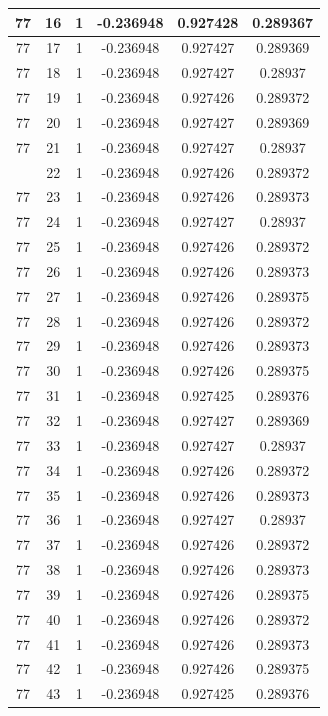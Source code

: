 \documentclass[12pt,a4paper]{article}
\numberwithin{equation}{section}
\numberwithin{figure}{section}
\numberwithin{table}{section}
\begin{document}
\begin{longtable}{|c|c|c|c|c|c|}
77 & 16 & 1 & -0.236948 & 0.927428 & 0.289367 \\ \hline
77 & 17 & 1 & -0.236948 & 0.927427 & 0.289369 \\ \hline
77 & 18 & 1 & -0.236948 & 0.927427 & 0.28937 \\ \hline
77 & 19 & 1 & -0.236948 & 0.927426 & 0.289372 \\ \hline
77 & 20 & 1 & -0.236948 & 0.927427 & 0.289369 \\ \hline
77 & 21 & 1 & -0.236948 & 0.927427 & 0.28937 \\ \hline
\pagebreak
77 & 22 & 1 & -0.236948 & 0.927426 & 0.289372 \\ \hline
77 & 23 & 1 & -0.236948 & 0.927426 & 0.289373 \\ \hline
77 & 24 & 1 & -0.236948 & 0.927427 & 0.28937 \\ \hline
77 & 25 & 1 & -0.236948 & 0.927426 & 0.289372 \\ \hline
77 & 26 & 1 & -0.236948 & 0.927426 & 0.289373 \\ \hline
77 & 27 & 1 & -0.236948 & 0.927426 & 0.289375 \\ \hline
77 & 28 & 1 & -0.236948 & 0.927426 & 0.289372 \\ \hline
77 & 29 & 1 & -0.236948 & 0.927426 & 0.289373 \\ \hline
77 & 30 & 1 & -0.236948 & 0.927426 & 0.289375 \\ \hline
77 & 31 & 1 & -0.236948 & 0.927425 & 0.289376 \\ \hline
77 & 32 & 1 & -0.236948 & 0.927427 & 0.289369 \\ \hline
77 & 33 & 1 & -0.236948 & 0.927427 & 0.28937 \\ \hline
77 & 34 & 1 & -0.236948 & 0.927426 & 0.289372 \\ \hline
77 & 35 & 1 & -0.236948 & 0.927426 & 0.289373 \\ \hline
77 & 36 & 1 & -0.236948 & 0.927427 & 0.28937 \\ \hline
77 & 37 & 1 & -0.236948 & 0.927426 & 0.289372 \\ \hline
77 & 38 & 1 & -0.236948 & 0.927426 & 0.289373 \\ \hline
77 & 39 & 1 & -0.236948 & 0.927426 & 0.289375 \\ \hline
77 & 40 & 1 & -0.236948 & 0.927426 & 0.289372 \\ \hline
77 & 41 & 1 & -0.236948 & 0.927426 & 0.289373 \\ \hline
77 & 42 & 1 & -0.236948 & 0.927426 & 0.289375 \\ \hline
77 & 43 & 1 & -0.236948 & 0.927425 & 0.289376 \\ \hline

\end{longtable}
\end{document}
